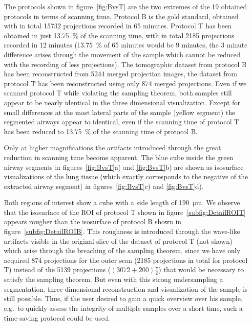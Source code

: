 The protocols shown in figure~\ref{fig:BvsT} are the two extremes of the 19 obtained protocols  in terms of scanning time. Protocol B is the gold standard, obtained with in total 15732 projections recorded in 65 minutes. Protocol T has been obtained in just \SI{13.75}{\percent} of the scanning time, with in total 2185 projections recorded in 12 minutes (\SI{13.75}{\percent} of 65 minutes would be 9 minutes, the 3 minute difference arises through the movement of the sample which cannot be reduced with the recording of less projections). The tomographic dataset from protocol B has been reconstructed from 5244 merged projection images, the dataset from protocol T has been reconstructed using only 874 merged projections. Even if we scanned protocol T while violating the sampling theorem, both samples still appear to be nearly identical in the three dimensional visualization. Except for small differences at the most lateral parts of the sample (yellow segment) the segmented airways appear to identical, even if the scanning time of protocol T has been reduced to \SI{13.75}{\percent} of the scanning time of protocol B.

Only at higher magnifications the artifacts introduced through the great reduction in scanning time become apparent. The blue cube inside the green airway segments in figures~\ref{fig:BvsT}a) and \ref{fig:BvsT}b) are shown as isosurface visualizations of the lung tissue (which exactly corresponds to the negative of the extracted airway segment) in figures~\ref{fig:BvsT}c) and \ref{fig:BvsT}d).

Both regions of interest show a cube with a side length of \SI{190}{\micro\meter}. We observe that the isosurface of the ROI of protocol T shown in figure~\ref{subfig:DetailROIT} appears rougher than the isosurface of protocol B shown in figure~\ref{subfig:DetailROIB}. This roughness is introduced through the wave-like artifacts visible in the original slice of the dataset of protocol T (not shown) which arise through the breaching of the sampling theorem, since we have only acquired 874 projections for the outer scan (2185 projections in total for protocol T) instead of the 5139 projections ($(3072+200)\frac{\pi}{2}$) that would be necessary to satisfy the sampling theorem. But even with this strong undersampling a segmentation, three dimensional reconstruction and visualization of the sample is still possible. Thus, if the user desired to gain a quick overview over his sample, e.g.\ to quickly assess the integrity of multiple samples over a short time, such a time-saving protocol could be used.

